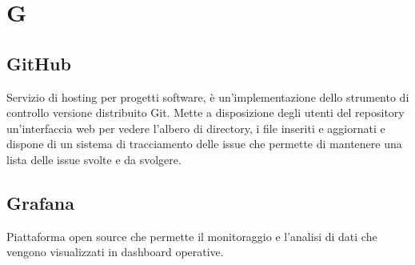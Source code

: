 \section*{G}

\subsection{GitHub}
Servizio di hosting per progetti software, è un'implementazione dello strumento di controllo versione distribuito Git. Mette a disposizione degli utenti del repository un'interfaccia web per vedere l'albero di directory, i file inseriti e aggiornati e dispone di un sistema di tracciamento delle issue che permette di mantenere una lista delle issue svolte e da svolgere.


\subsection{Grafana}
Piattaforma open source che permette il monitoraggio e l'analisi di dati che vengono visualizzati in dashboard operative. 